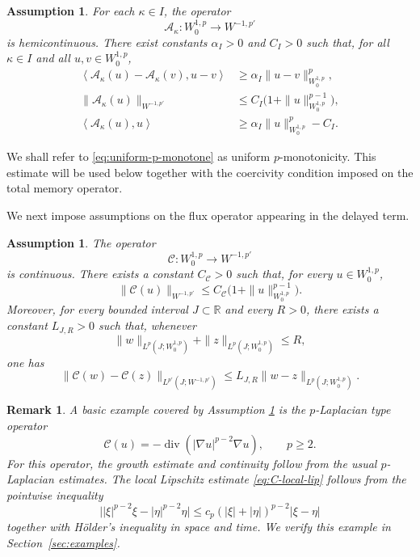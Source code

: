 \documentclass[a4paper,11pt,oneside,reqno]{amsart}
\newtheorem{assumption}[theorem]{Assumption}
\newtheorem{remark}[theorem]{Remark}
\newcounter{c}
\newcounter{d}
\newcounter{b}
\newcommand{\R}{\mathbb{R}}
\newcommand{\diver}{\operatorname{div}}
\newcommand{\dual}[2]{\left\langle #1,#2\right\rangle}
\begin{document}
\begin{assumption}\label{ass:current}
For each $\kappa\in I$, the operator
\[
 \mathcal A_\kappa:W^{1,p}_0\to W^{-1,p'}
\]
is hemicontinuous.  There exist constants $\alpha_I>0$ and $C_I>0$ such
that, for all $\kappa\in I$ and all $u,v\in W^{1,p}_0$,
\begin{align}
 \dual{\mathcal A_\kappa(u)-\mathcal A_\kappa(v)}{u-v}
 &\ge \alpha_I\|u-v\|_{W^{1,p}_0}^p,
 \label{eq:uniform-p-monotone}\\
 \|\mathcal A_\kappa(u)\|_{W^{-1,p'}}
 &\le C_I\bigl(1+\|u\|_{W^{1,p}_0}^{p-1}\bigr),
 \label{eq:Akappa-growth}\\
 \dual{\mathcal A_\kappa(u)}{u}
 &\ge \alpha_I\|u\|_{W^{1,p}_0}^p-C_I.
 \label{eq:Akappa-coercive}
\end{align}
\end{assumption}
We shall refer to \eqref{eq:uniform-p-monotone} as uniform \(p\)-monotonicity.
This estimate will be used below together with the coercivity condition
imposed on the total memory operator.

We next impose assumptions on the flux operator appearing in the delayed term.
\begin{assumption}\label{ass:delayed-flux}
The operator
\[
 \mathcal C:W^{1,p}_0\to W^{-1,p'}
\]
is continuous.  There exists a constant $C_{\mathcal C}>0$ such that, for every
$u\in W^{1,p}_0$,
\begin{equation}
 \|\mathcal C(u)\|_{W^{-1,p'}}
 \le C_{\mathcal C}\bigl(1+\|u\|_{W^{1,p}_0}^{p-1}\bigr).
 \label{eq:C-growth}
\end{equation}
Moreover, for every bounded interval $J\subset\R$ and every $R>0$, there
exists a constant $L_{J,R}>0$ such that, whenever
\[
 \|w\|_{L^p(J;W^{1,p}_0)}
 +
 \|z\|_{L^p(J;W^{1,p}_0)}
 \le R,
\]
one has
\begin{equation}
 \|\mathcal C(w)-\mathcal C(z)\|_{L^{p'}(J;W^{-1,p'})}
 \le
 L_{J,R}\|w-z\|_{L^p(J;W^{1,p}_0)}.
 \label{eq:C-local-lip}
\end{equation}
\end{assumption}



\begin{remark}\label{rem:p-laplace-flux}
A basic example covered by Assumption \ref{ass:delayed-flux} is the
$p$-Laplacian type operator
\[
 \mathcal C(u)=-\diver(|\nabla u|^{p-2}\nabla u),
 \qquad p\ge2.
\]
For this operator, the growth estimate and continuity follow from the usual
$p$-Laplacian estimates. The local Lipschitz estimate \eqref{eq:C-local-lip} follows from the pointwise inequality
\[
 \bigl||\xi|^{p-2}\xi-|\eta|^{p-2}\eta\bigr|
 \le c_p(|\xi|+|\eta|)^{p-2}|\xi-\eta|
\]
together with Hölder's inequality in space and time. We verify this example in Section~\ref{sec:examples}.
\end{remark}
\end{document}
